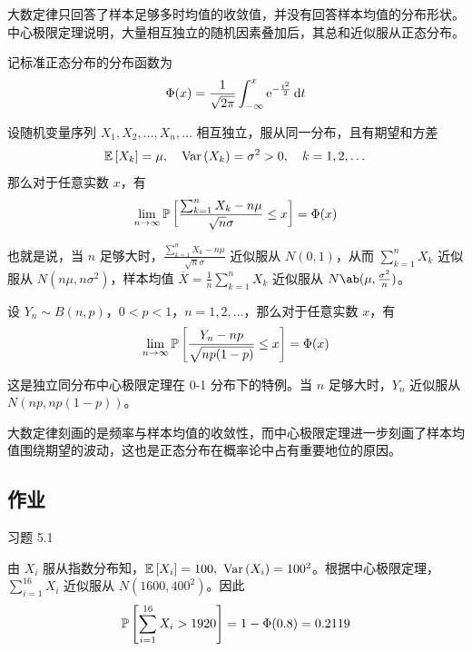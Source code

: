 大数定律只回答了样本足够多时均值的收敛值，并没有回答样本均值的分布形状。中心极限定理说明，大量相互独立的随机因素叠加后，其总和近似服从正态分布。

记标准正态分布的分布函数为
$$
\Phi(x) = \frac{1}{\sqrt{2 \pi}} \int_{- \infty}^{x} \mathrm{e}^{-\frac{t^2}{2}} \dd{t}
$$

\begin{theorem}[独立同分布的中心极限定理]
    设随机变量序列 $X_1, X_2, \dots, X_n, \dots$ 相互独立，服从同一分布，且有期望和方差
    $$
    \operatorname{\mathbb{E}}\left[X_k\right] = \mu, \quad \operatorname{Var}\left(X_k\right) = \sigma^2 > 0, \quad k = 1, 2, \dots
    $$
    那么对于任意实数 $x$，有
    $$
    \lim_{n \to \infty} \operatorname{\mathbb{P}}\left[\frac{\sum_{k = 1}^{n} X_k - n \mu}{\sqrt{n} \sigma} \le x\right] = \Phi(x)
    $$
\end{theorem}

也就是说，当 $n$ 足够大时，$\frac{\sum_{k = 1}^{n} X_k - n \mu}{\sqrt{n} \sigma}$ 近似服从 $N(0, 1)$，从而 $\sum_{k = 1}^{n} X_k$ 近似服从 $N(n \mu, n \sigma^2)$，样本均值 $\overline{X} = \frac{1}{n} \sum_{k = 1}^{n} X_k$ 近似服从 $N\ab(\mu, \frac{\sigma^2}{n})$。

\begin{theorem}
    设 $Y_n \sim B(n, p)$，$0 < p < 1$，$n = 1, 2, \dots$，那么对于任意实数 $x$，有
    $$
    \lim_{n \to \infty} \operatorname{\mathbb{P}}\left[\frac{Y_n - n p}{\sqrt{n p (1 - p)}} \le x\right] = \Phi(x)
    $$
\end{theorem}

这是独立同分布中心极限定理在 0-1 分布下的特例。当 $n$ 足够大时，$Y_n$ 近似服从 $N(np, np(1 - p))$。

大数定律刻画的是频率与样本均值的收敛性，而中心极限定理进一步刻画了样本均值围绕期望的波动，这也是正态分布在概率论中占有重要地位的原因。

\subsection{作业}

\begin{problem}
    习题 5.1
    \begin{solution}
        由 $X_i$ 服从指数分布知，$\expect{X_i} = 100,\ \variance{X_i} = 100^2$。根据中心极限定理，$\sum_{i = 1}^{16} X_i$ 近似服从 $N(1600, 400^2)$。因此
        $$
        \operatorname{\mathbb{P}}\left[\sum_{i = 1}^{16} X_i > 1920\right] = 1 - \Phi(0.8) = 0.2119
        $$
    \end{solution}
\end{problem}

